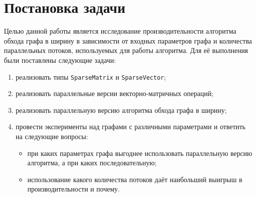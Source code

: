 
\section{Постановка задачи}
\label{sec:task}
Целью данной работы является исследование производительности алгоритма обхода графа в ширину в зависимости от входных параметров графа и количества параллельных потоков, используемых для работы алгоритма. Для её выполнения были поставлены следующие задачи:

 \begin{enumerate}
 \item  реализовать типы \texttt{SparseMatrix} и \texttt{SparseVector};
 \item  реализовать параллельные версии векторно-матричных операций;
 \item  реализовать параллельную версию алгоритма обхода графа в ширину;
 \item  провести эксперименты над графами с различными параметрами и ответить на следующие вопросы:
   \begin{itemize}
   \item  при каких параметрах графа выгоднее использовать параллельную версию алгоритма, а при каких последовательную;
   \item  использование какого количества потоков даёт наибольший выигрыш в производительности и почему.
   \end{itemize}
 \end{enumerate}
